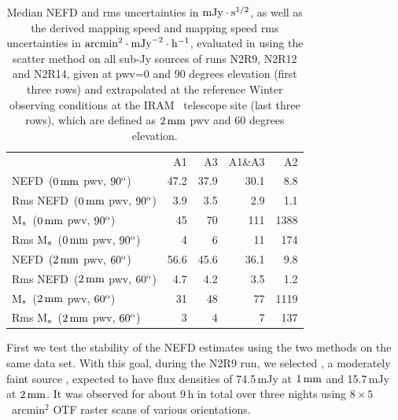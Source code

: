 \begin{table}[!thbp]
  \begin{center}
    \caption[NEFD estimates on all sub-Jy sources]{Median NEFD and rms
      uncertainties in $\rm{mJy}\cdot s^{1/2}$, as well as the derived mapping
      speed and mapping speed rms uncertainties in
    $\rm{arcmin}^2\cdot \rm{mJy}^{-2}\cdot\rm{h}^{-1}$, evaluated
      in using the scatter method on all sub-Jy sources of runs N2R9, N2R12
      and N2R14, given at pwv=0 and 90 degrees elevation (first three rows) and extrapolated at the
      reference Winter observing conditions at the IRAM
      \trentemetre\ telescope site (last three rows), which are defined
      as $2\,\rm{mm}$ pwv and 60 degrees elevation.}
    \label{tab:nefd_astro}
    \begin{tabular}{lrrrr}
      \hline\hline
      \noalign{\smallskip}
                    & A1      &   A3    &   A1\&A3 &    A2 \\
      \noalign{\smallskip}
      \hline
      \noalign{\smallskip}
      NEFD\, \small{($0\,\rm{mm}$ pwv, $90^{\rm{o}}$)}             & 47.2    & 37.9    &    30.1  &    8.8   \\
      Rms NEFD\, \small{($0\,\rm{mm}$ pwv, $90^{\rm{o}}$)}         &  3.9    &  3.5    &     2.9  &    1.1   \\
      M$_{\rm{s}}$\, \small{($0\,\rm{mm}$ pwv, $90^{\rm{o}}$)}      & 45      &  70     &    111   &   1388   \\
      Rms M$_{\rm{s}}$\, \small{($0\,\rm{mm}$ pwv, $90^{\rm{o}}$)}  &  4      &   6     &     11   &    174   \\
      \hline
      \noalign{\smallskip}
      NEFD\, \small{($2\,\rm{mm}$ pwv, $60^{\rm{o}}$)}             & 56.6    & 45.6    &    36.1  &    9.8   \\
      Rms NEFD\, \small{($2\,\rm{mm}$ pwv, $60^{\rm{o}}$)}         &  4.7    & 4.2     &     3.5  &    1.2   \\
      M$_{\rm{s}}$\, \small{($2\,\rm{mm}$ pwv, $60^{\rm{o}}$)}      &  31    & 48       &    77   &   1119   \\
      Rms M$_{\rm{s}}$\, \small{($2\,\rm{mm}$ pwv, $60^{\rm{o}}$)}  &   3    &  4       &     7     &  137   \\
      \hline
    \end{tabular}
\end{center}
\end{table}

First we test the stability of the NEFD estimates using the two methods on the
same data set. With this goal, during the N2R9 run, we selected \hls, a
moderately faint source \citep{2012A&A...538L...4C}, expected to have
flux densities of 74.5\,mJy at $1\,\rm{mm}$
and 15.7\,mJy at $2\, \rm{mm}$. %
It was observed for about 9\,h in total over three nights using
$8 \times 5$~arcmin$^2$ OTF raster scans of various orientations.\\


